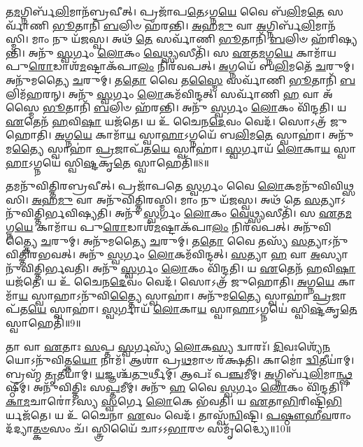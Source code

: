    𑌤\-\ul{𑌮}\-𑌗𑍍𑌨𑌿𑌰𑍍𑌬᳴\-\ul{𑌲𑌿}\-𑌮𑌾𑌨᳴𑌬𑍍𑌰𑌵𑍀𑌤𑍍।
   𑌪𑍍𑌰𑌜𑌾᳴𑌪\-\ul{𑌤𑍇}\-𑌽𑌗𑍍𑌨\-\ul{𑌯𑍇} 𑌵𑍈 𑌬᳴\-\ul{𑌲𑌿}\-𑌮\-\ul{𑌤𑍇} 𑌸𑌰𑍍𑌵𑌾᳴𑌣𑌿 \ul{𑌭𑍂}\-𑌤𑌾𑌨𑌿᳴ \ul{𑌬}\-𑌲𑌿𑍞 𑌹᳴𑌰𑌨𑍍𑌤𑌿।
   \ul{𑌅}\-𑌹\-\ul{𑌮𑍁} 𑌵𑌾 \ul{𑌅}\-𑌗𑍍𑌨𑌿𑌰𑍍𑌬᳴\-\ul{𑌲𑌿}\-𑌮𑌾𑌨᳴𑌸𑍍𑌮𑌿।
   𑌮𑌾𑌂 𑌨𑍁 𑌯᳴𑌜𑌸𑍍𑌵।
   𑌅𑌥᳴ \ul{𑌤𑍇} 𑌸𑌰𑍍𑌵𑌾᳴𑌣𑌿 \ul{𑌭𑍂}\-𑌤𑌾𑌨𑌿᳴ \ul{𑌬}\-𑌲𑌿𑍞 𑌹᳴𑌰𑌿𑌷𑍍𑌯𑌨𑍍𑌤𑌿।
   𑌅𑌨𑍁᳴ \ul{𑌸𑍍𑌵}\-𑌰𑍍𑌗𑌂 \ul{𑌲𑍋}\-𑌕𑌂 \ul{𑌵𑍇}\-𑌥𑍍𑌸𑍍𑌯𑌸𑍀𑌤𑌿᳴।
   𑌸 \ul{𑌏}\-𑌤\-\ul{𑌮}\-𑌗𑍍𑌨\-\ul{𑌯𑍇} 𑌕𑌾𑌮𑌾᳴𑌯 𑌪𑍁\-\ul{𑌰𑍋}\-𑌡𑌾𑌶᳴\-\ul{𑌮}\-𑌷𑍍𑌟𑌾𑌕᳴𑌪𑌾\-\ul{𑌲𑌂} 𑌨𑌿𑌰᳴𑌵𑌪𑌤𑍍।
   \ul{𑌅}\-𑌗𑍍𑌨𑌯𑍇᳴ 𑌬\-\ul{𑌲𑌿}\-𑌮𑌤𑍇᳴ \ul{𑌚}\-𑌰𑍁𑌮𑍍।
   𑌅𑌨𑍁᳴𑌮𑌤𑍍𑌯𑍈 \ul{𑌚}\-𑌰𑍁𑌮𑍍।
   𑌤\-\ul{𑌤𑍋} 𑌵𑍈 𑌤\-\ul{𑌸𑍍𑌮𑍈} 𑌸𑌰𑍍𑌵𑌾᳴𑌣𑌿 \ul{𑌭𑍂}\-𑌤𑌾𑌨𑌿᳴ \ul{𑌬}\-𑌲𑌿𑌮᳴𑌹𑌰𑌨𑍍।
   𑌅𑌨𑍁᳴ \ul{𑌸𑍍𑌵}\-𑌰𑍍𑌗𑌂 \ul{𑌲𑍋}\-𑌕𑌮᳴𑌵𑌿𑌨𑍍𑌦𑌤𑍍।
   𑌸𑌰𑍍𑌵𑌾᳴𑌣𑌿 \ul{𑌹} 𑌵𑌾 𑌅᳴𑌸𑍍𑌮𑍈 \ul{𑌭𑍂}\-𑌤𑌾𑌨𑌿᳴ \ul{𑌬}\-𑌲𑌿𑍞 𑌹᳴𑌰𑌨𑍍𑌤𑌿।
   𑌅𑌨𑍁᳴ \ul{𑌸𑍍𑌵}\-𑌰𑍍𑌗𑌂 \ul{𑌲𑍋}\-𑌕𑌂 𑌵𑌿᳴𑌨𑍍𑌦𑌤𑌿।
   𑌯 \ul{𑌏}\-𑌤𑍇𑌨᳴ \ul{𑌹}\-𑌵𑌿\-\ul{𑌷𑌾} 𑌯𑌜᳴𑌤𑍇।
   𑌯 𑌉᳴ 𑌚𑍈𑌨\-\ul{𑌦𑍇}\-𑌵𑌂 𑌵𑍇𑌦᳴।
   𑌸𑍋𑌽𑌤𑍍𑌰᳴ 𑌜𑍁𑌹𑍋𑌤𑌿।
   \ul{𑌅}\-𑌗𑍍𑌨\-\ul{𑌯𑍇} 𑌕𑌾𑌮𑌾᳴\-\ul{𑌯} 𑌸𑍍𑌵𑌾\-\ul{𑌹𑌾}\-𑌽𑌗𑍍𑌨𑌯𑍇᳴ 𑌬\-\ul{𑌲𑌿}\-𑌮\-\ul{𑌤𑍇} 𑌸𑍍𑌵𑌾𑌹𑌾॑।
   𑌅𑌨𑍁᳴𑌮\-\ul{𑌤𑍍𑌯𑍈} 𑌸𑍍𑌵𑌾𑌹𑌾॑ \ul{𑌪𑍍𑌰}\-𑌜𑌾𑌪᳴𑌤\-\ul{𑌯𑍇} 𑌸𑍍𑌵𑌾𑌹𑌾॑।
   \ul{𑌸𑍍𑌵}\-𑌰𑍍𑌗𑌾𑌯᳴ \ul{𑌲𑍋}\-𑌕𑌾\-\ul{𑌯} 𑌸𑍍𑌵𑌾\-\ul{𑌹𑌾}\-𑌽𑌗𑍍𑌨𑌯𑍇॑ 𑌸𑍍𑌵𑌿\-\ul{𑌷𑍍𑌟}\-𑌕𑍃\-\ul{𑌤𑍇} 𑌸𑍍𑌵𑌾𑌹𑍇𑌤𑌿᳴॥8॥

   𑌤𑌮𑌨𑍁᳴𑌵𑌿𑌤𑍍𑌤𑌿𑌰𑌬𑍍𑌰𑌵𑍀𑌤𑍍।
   𑌪𑍍𑌰𑌜𑌾᳴𑌪𑌤𑍇 \ul{𑌸𑍍𑌵}\-𑌰𑍍𑌗𑌂 𑌵𑍈 \ul{𑌲𑍋}\-𑌕𑌮𑌨𑍁᳴𑌵𑌿𑌵𑌿𑌥𑍍𑌸𑌸𑌿।
   \ul{𑌅}\-𑌹\-\ul{𑌮𑍁} 𑌵𑌾 𑌅𑌨𑍁᳴𑌵𑌿𑌤𑍍𑌤𑌿𑌰𑌸𑍍𑌮𑌿।
   𑌮𑌾𑌂 𑌨𑍁 𑌯᳴𑌜𑌸𑍍𑌵।
   𑌅𑌥᳴ 𑌤𑍇 \ul{𑌸}\-𑌤𑍍𑌯𑌾𑌽𑌨𑍁᳴𑌵𑌿𑌤𑍍𑌤𑌿𑌰𑍍𑌭𑌵𑌿𑌷𑍍𑌯𑌤𑌿।
   𑌅𑌨𑍁᳴ \ul{𑌸𑍍𑌵}\-𑌰𑍍𑌗𑌂 \ul{𑌲𑍋}\-𑌕𑌂 \ul{𑌵𑍇}\-𑌥𑍍𑌸𑍍𑌯𑌸𑍀𑌤𑌿᳴।
   𑌸 \ul{𑌏}\-𑌤\-\ul{𑌮}\-𑌗𑍍𑌨\-\ul{𑌯𑍇} 𑌕𑌾𑌮𑌾᳴𑌯 𑌪𑍁\-\ul{𑌰𑍋}\-𑌡𑌾𑌶᳴\-\ul{𑌮}\-𑌷𑍍𑌟𑌾𑌕᳴𑌪𑌾\-\ul{𑌲𑌂} 𑌨𑌿𑌰᳴𑌵𑌪𑌤𑍍।
   𑌅𑌨𑍁᳴𑌵𑌿𑌤𑍍𑌤𑍍𑌯𑍈 \ul{𑌚}\-𑌰𑍁𑌮𑍍।
   𑌅𑌨𑍁᳴𑌮𑌤𑍍𑌯𑍈 \ul{𑌚}\-𑌰𑍁𑌮𑍍।
   𑌤\-\ul{𑌤𑍋} 𑌵𑍈 𑌤𑌸𑍍𑌯᳴ \ul{𑌸}\-𑌤𑍍𑌯𑌾𑌽𑌨𑍁᳴𑌵𑌿𑌤𑍍𑌤𑌿𑌰𑌭𑌵𑌤𑍍।
   𑌅𑌨𑍁᳴ \ul{𑌸𑍍𑌵}\-𑌰𑍍𑌗𑌂 \ul{𑌲𑍋}\-𑌕𑌮᳴𑌵𑌿𑌨𑍍𑌦𑌤𑍍।
   \ul{𑌸}\-𑌤𑍍𑌯𑌾 \ul{𑌹} 𑌵𑌾 \ul{𑌅}\-𑌸𑍍𑌯𑌾𑌨𑍁᳴𑌵𑌿𑌤𑍍𑌤𑌿𑌰𑍍𑌭𑌵𑌤𑌿।
   𑌅𑌨𑍁᳴ \ul{𑌸𑍍𑌵}\-𑌰𑍍𑌗𑌂 \ul{𑌲𑍋}\-𑌕𑌂 𑌵𑌿᳴𑌨𑍍𑌦𑌤𑌿।
   𑌯 \ul{𑌏}\-𑌤𑍇𑌨᳴ \ul{𑌹}\-𑌵𑌿\-\ul{𑌷𑌾} 𑌯𑌜᳴𑌤𑍇।
   𑌯 𑌉᳴ 𑌚𑍈𑌨\-\ul{𑌦𑍇}\-𑌵𑌂 𑌵𑍇𑌦᳴।
   𑌸𑍋𑌽𑌤𑍍𑌰᳴ 𑌜𑍁𑌹𑍋𑌤𑌿।
   \ul{𑌅}\-𑌗𑍍𑌨\-\ul{𑌯𑍇} 𑌕𑌾𑌮𑌾᳴\-\ul{𑌯} 𑌸𑍍𑌵𑌾𑌹𑌾𑌽𑌨𑍁᳴𑌵𑌿\-\ul{𑌤𑍍𑌤𑍍𑌯𑍈} 𑌸𑍍𑌵𑌾𑌹𑌾॑।
   𑌅𑌨𑍁᳴𑌮\-\ul{𑌤𑍍𑌯𑍈} 𑌸𑍍𑌵𑌾𑌹𑌾॑ \ul{𑌪𑍍𑌰}\-𑌜𑌾𑌪᳴𑌤\-\ul{𑌯𑍇} 𑌸𑍍𑌵𑌾𑌹𑌾॑।
   \ul{𑌸𑍍𑌵}\-𑌰𑍍𑌗𑌾𑌯᳴ \ul{𑌲𑍋}\-𑌕𑌾\-\ul{𑌯} 𑌸𑍍𑌵𑌾\-\ul{𑌹𑌾}\-𑌽𑌗𑍍𑌨𑌯𑍇॑ 𑌸𑍍𑌵𑌿\-\ul{𑌷𑍍𑌟}\-𑌕𑍃\-\ul{𑌤𑍇} 𑌸𑍍𑌵𑌾𑌹𑍇𑌤𑌿᳴॥9॥

   𑌤𑌾 𑌵𑌾 \ul{𑌏}\-𑌤𑌾𑌃 \ul{𑌸}\-𑌪𑍍𑌤 \ul{𑌸𑍍𑌵}\-𑌰𑍍𑌗𑌸𑍍𑌯᳴ \ul{𑌲𑍋}\-𑌕\-\ul{𑌸𑍍𑌯} 𑌦𑍍𑌵𑌾𑌰𑌃᳴।
   \ul{𑌦𑌿}\-𑌵𑌃𑌶𑍍𑌯𑍇᳴\-\ul{𑌨}\-𑌯𑍋𑌽𑌨𑍁᳴\-𑌵𑌿𑌤𑍍𑌤\-\ul{𑌯𑍋} 𑌨𑌾𑌮᳴।
   𑌆𑌶𑌾॑ 𑌪𑍍𑌰\-\ul{𑌥}\-𑌮𑌾𑍞 𑌰᳴𑌕𑍍𑌷𑌤𑌿।
   𑌕𑌾𑌮𑍋॑ \ul{𑌦𑍍𑌵𑌿}\-𑌤𑍀𑌯𑌾॑𑌮𑍍।
   𑌬𑍍𑌰𑌹𑍍𑌮᳴ \ul{𑌤𑍃}\-𑌤𑍀𑌯𑌾॑𑌮𑍍।
   \ul{𑌯}\-𑌜𑍍𑌞𑌶𑍍𑌚᳴\-\ul{𑌤𑍁}\-𑌰𑍍𑌥𑍀𑌮𑍍।
   𑌆𑌪𑌃᳴ 𑌪\-\ul{𑌞𑍍𑌚}\-𑌮𑍀𑌮𑍍।
   \ul{𑌅}\-𑌗𑍍𑌨𑌿𑌰𑍍𑌬᳴\-\ul{𑌲𑌿}\-𑌮𑌾\-\ul{𑌨𑍍𑌥𑍍𑌷}\-𑌷𑍍𑌠𑍀𑌮𑍍।
   𑌅𑌨𑍁᳴𑌵𑌿𑌤𑍍𑌤𑌿𑌃 𑌸\-\ul{𑌪𑍍𑌤}\-𑌮𑍀𑌮𑍍।
   𑌅𑌨𑍁᳴ \ul{𑌹} 𑌵𑍈 \ul{𑌸𑍍𑌵}\-𑌰𑍍𑌗𑌂 \ul{𑌲𑍋}\-𑌕𑌂 𑌵𑌿᳴𑌨𑍍𑌦𑌤𑌿।
   \ul{𑌕𑌾}\-\-\ul{𑌮}\-𑌚𑌾𑌰𑍋॑𑌽𑌸𑍍𑌯 \ul{𑌸𑍍𑌵}\-𑌰𑍍𑌗𑍇 \ul{𑌲𑍋}\-𑌕𑍇 𑌭᳴𑌵𑌤𑌿।
   𑌯 \ul{𑌏}\-𑌤𑌾\-\ul{𑌭𑌿}\-𑌰𑌿𑌷𑍍𑌟𑌿᳴\-\ul{𑌭𑌿}\-𑌰𑍍𑌯𑌜᳴𑌤𑍇।
   𑌯 𑌉᳴ 𑌚𑍈𑌨𑌾 \ul{𑌏}\-𑌵𑌂 𑌵𑍇𑌦᳴।
   𑌤𑌾𑌸𑍍𑌵᳴\-\ul{𑌨𑍍𑌵𑌿}\-𑌷𑍍𑌟𑌿।
   \ul{𑌪}\-\-\ul{𑌷𑍍𑌠𑍗}\-\-\ul{𑌹𑍀}\-\-\ul{𑌵}\-𑌰𑌾𑌂 𑌦᳴𑌦𑍍𑌯𑌾\-\ul{𑌤𑍍𑌕}\-\-\ul{𑍞}\-𑌸𑌂 𑌚᳴।
   𑌸𑍍𑌤𑍍𑌰𑌿𑌯𑍈᳴ 𑌚𑌾𑌽𑌽\-\ul{𑌭𑌾}\-𑌰𑍞 𑌸𑌮𑍃᳴𑌦𑍍𑌧𑍍𑌯𑍈॥10॥\anuvakamend
  
